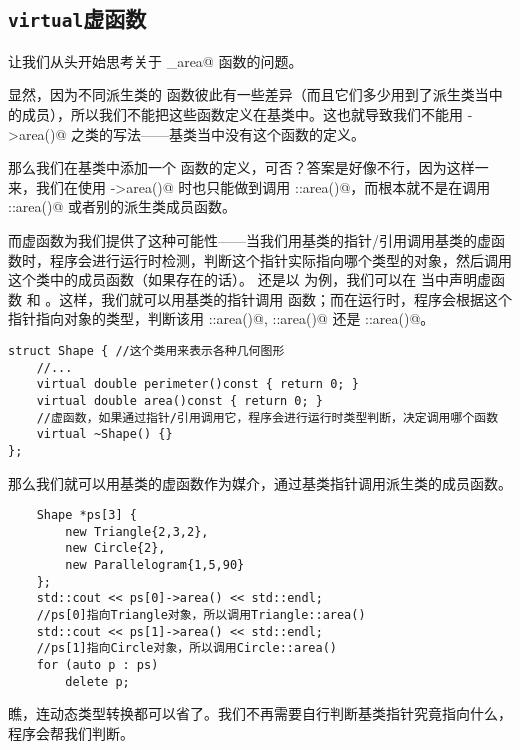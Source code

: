 \subsection*{\texttt{virtual}虚函数}
让我们从头开始思考关于 \lstinline@shape_area@ 函数的问题。\par
显然，因为不同派生类的 \lstinline@area@ 函数彼此有一些差异（而且它们多少用到了派生类当中的成员），所以我们不能把这些函数定义在基类中。这也就导致我们不能用 \lstinline@sh->area()@ 之类的写法——基类当中没有这个函数的定义。\par
那么我们在基类中添加一个 \lstinline@area@ 函数的定义，可否？答案是好像不行，因为这样一来，我们在使用 \lstinline@sh->area()@ 时也只能做到调用 \lstinline@Shape::area()@，而根本就不是在调用 \lstinline@Triangle::area()@ 或者别的派生类成员函数。\par
而虚函数为我们提供了这种可能性——当我们用基类的指针/引用调用基类的虚函数时，程序会进行运行时检测，判断这个指针实际指向哪个类型的对象，然后调用这个类中的成员函数（如果存在的话）。
还是以 \lstinline@Shape@ 为例，我们可以在 \lstinline@Shape@ 当中声明虚函数 \lstinline@perimeter@ 和 \lstinline@area@。这样，我们就可以用基类的指针调用 \lstinline@area@ 函数；而在运行时，程序会根据这个指针指向对象的类型，判断该用 \lstinline@Triangle::area()@, \lstinline@Circle::area()@ 还是 \lstinline@Parallelogram::area()@。
\begin{lstlisting}
struct Shape { //这个类用来表示各种几何图形
    //...
    virtual double perimeter()const { return 0; }
    virtual double area()const { return 0; }
    //虚函数，如果通过指针/引用调用它，程序会进行运行时类型判断，决定调用哪个函数
    virtual ~Shape() {} 
};
\end{lstlisting}
那么我们就可以用基类的虚函数作为媒介，通过基类指针调用派生类的成员函数。
\begin{lstlisting}
    Shape *ps[3] {
        new Triangle{2,3,2},
        new Circle{2},
        new Parallelogram{1,5,90}
    };
    std::cout << ps[0]->area() << std::endl;
    //ps[0]指向Triangle对象，所以调用Triangle::area()
    std::cout << ps[1]->area() << std::endl;
    //ps[1]指向Circle对象，所以调用Circle::area()
    for (auto p : ps)
        delete p;
\end{lstlisting}
瞧，连动态类型转换都可以省了。我们不再需要自行判断基类指针究竟指向什么，程序会帮我们判断。\par
